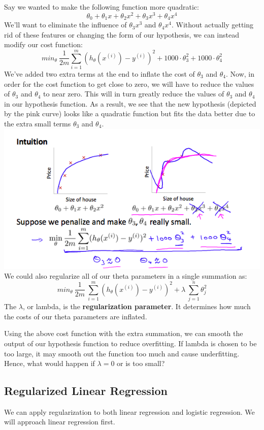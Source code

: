 \documentclass{article}
\begin{document}
Say we wanted to make the following function more quadratic:
$$\theta_0 + \theta_1x + \theta_2x^2 + \theta_3x^3 + \theta_4x^4$$
We'll want to eliminate the influence of $\theta_3x^3$ and $\theta_4x^4$. Without actually getting rid of these features or changing the form of our hypothesis, we can instead modify our cost function:
$$min_\theta\ \dfrac{1}{2m}\sum_{i=1}^m (h_\theta(x^{(i)}) - y^{(i)})^2 + 1000\cdot\theta_3^2 + 1000\cdot\theta_4^2$$
We've added two extra terms at the end to inflate the cost of $\theta_3$ and $\theta_4$. Now, in order for the cost function to get close to zero, we will have to reduce the values of $\theta_3$ and $\theta_4$ to near zero. This will in turn greatly reduce the values of $\theta_3$ and $\theta_4$ in our hypothesis function. As a result, we see that the new hypothesis (depicted by the pink curve) looks like a quadratic function but fits the data better due to the extra small terms $\theta_3$ and $\theta_4$.\\
\includegraphics[width=\textwidth]{Modify-Cost-Function.png}
We could also regularize all of our theta parameters in a single summation as:
$$min_\theta\ \dfrac{1}{2m}\  \sum_{i=1}^m (h_\theta(x^{(i)}) - y^{(i)})^2 + \lambda\ \sum_{j=1}^n \theta_j^2$$
The $\lambda$, or lambda, is the \textbf{regularization parameter}. It determines how much the costs of our theta parameters are inflated.

Using the above cost function with the extra summation, we can smooth the output of our hypothesis function to reduce overfitting. If lambda is chosen to be too large, it may smooth out the function too much and cause underfitting. Hence, what would happen if $\lambda = 0$ or is too small?

\subsection{Regularized Linear Regression}
We can apply regularization to both linear regression and logistic regression. We will approach linear regression first.
\end{document}
